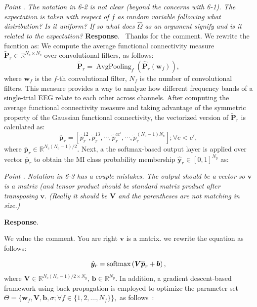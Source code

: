 \documentclass[runningheads]{llncs}
\newcommand{\Real}{\mathbb{R}}
\newcommand{\ve}[1]{\bm {#1}}
\newcommand{\mat}[1]{\bm {#1}}
\newenvironment{reviewer}{\setcounter{pointcounter}{1}}{}
\newcommand{\changes}[1]{\textcolor[rgb]{1.00,0.00,0.00}{#1}}
\newcommand{\point}[1]{\medskip \noindent
  \textsl{{\fontseries{b}\selectfont Point \thepointcounter}.
\stepcounter{pointcounter} #1}}
\newcommand{\reply}{\medskip \noindent \textbf{Response}.\ }
\begin{document}
\begin{reviewer}
    \point{The notation in 6-2 is not clear (beyond the concerns with
      6-1). The expectation is taken with respect of $f$ as random
      variable following what distribution? Is it uniform? If so what
      does $\hat{\Omega}$ as an argument signify and is it related to
    the expectation?}
    \reply{
      Thanks for the comment. We rewrite the fucntion as:
      \changes{ We compute the average functional connectivity
        measure $\tilde{\mat{P}}_r \in \Real^{N_c \times N_c}$ over
        convolutional filters, as follows:
        \begin{equation}
          \tilde{\mat{P}}_r  = \operatorname{AvgPooling}_{f}
          \left(\hat{\mat{P}}_{r}(\ve{w}_f)\right), \label{eq:lastlayerFC}
        \end{equation}
        where $\ve{w}_f$ is the $f$-th convolutional filter, $N_f$ is
        the number of convolutional filters. This measure provides a
        way to analyze how different frequency bands of a
        single-trial EEG relate to each other across channels. After
        computing the average functional connectivity measure and
        taking advantage of the symmetric property of the Gaussian
        functional connectivity, the vectorized version of
        $\tilde{\mat{P}}_r$ is calculated as:
        \begin{equation}
          \overline{\ve{p}}_r = \left[\tilde{p}_r^{12},
            \tilde{p}_r^{13}, \cdots, \tilde{p}_r^{cc'}, \cdots,
          \tilde{p}_r^{(N_c-1) N_c} \right]; \forall c<c',
        \end{equation}
        where $\overline{\ve{p}}_r \in  \Real ^{N_c(N_c-1)/2}$. Next,
        a the softmax-based output layer is applied over vector
        $\overline{\ve{p}}_r$ to obtain the MI class probability
        membership $\hat{\ve{y}}_r \in [0,1]^{N_y}$ as:
      }
    }

    \point{Notation in 6-3 has a couple mistakes. The output should
      be a vector so $\mathbf{v}$ is a matrix (and tensor product
        should be standard matrix product after transposing
        $\mathbf{v}$. (Really it should be $\mathbf{V}$ and the
      parentheses are not matching in size.) }

      \reply{
        We value the comment. You are right $\mathbf{v}$ is a matrix.
        we rewrite the equation as follows:

        \changes{
          \begin{equation}\label{eq:output}
            \hat{\ve{y}}_r =
            {\rm{softmax}}\left(\mat{V}\overline{\ve{p}}_r + \ve{b}\right),
          \end{equation}
          where $\mat{V}\in \Real^{N_c(N_c-1)/2\times N_y}$, $\ve{b}
          \in \Real^{N_y}$. In addition, a gradient descent-based
          framework using back-propagation is employed to optimize
          the parameter set
          $\Theta=\{\ve{w}_f,\mat{V},\ve{b},\sigma;\forall
          f\in\{1,2,\dots,N_f\}\},$ as follows~\cite{zhang2021dive}:
        }
      }


\end{reviewer}
\end{document}
